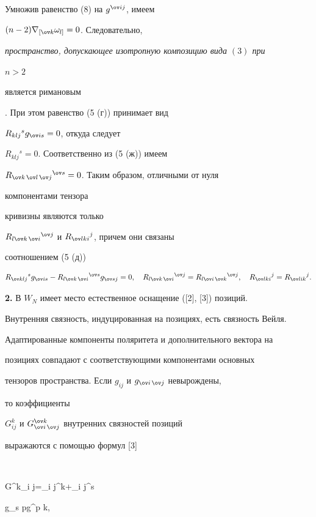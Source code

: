 Умножив равенство (8) на $g^{\ov i j}$, имеем 


$(n-2)\nabla_{[\ov k}\omega_{l]}=0$. Следовательно, 


{\it пространство, допускающее изотропную композицию вида $(3)$ при 


$n>2$ 


является римановым}. При этом равенство (5 (г)) принимает вид 


$R_{k l j}{}^s g_{\ov i s}=0$, откуда следует 


$R_{k l j}{}^s=0$. Соответственно из (5 (ж)) имеем 


$R_{\ov k\,\ov l\,\ov j}{}^{\ov s}=0$. Таким образом, отличными от нуля 


компонентами тензора 


кривизны являются только 


$R_{l\ov k\,\ov i}{}^{\ov j}$ и $R_{\ov l k i}{}^j$, причем они связаны 


соотношением (5 (д)) 


$$ 


R_{\ov k l j}{}^s g_{\ov i s}- 


R_{l\ov k\,\ov i}{}^{\ov s}g_{\ov s j}=0,\quad 


R_{l\ov k\,\ov i}{}^{\ov j}= 


R_{l\ov i\,\ov k}{}^{\ov j},\quad 


R_{\ov l k i}{}^j=R_{\ov l i k}{}^j. 


$$ 


 


{\bf 2.} В $W_N$ имеет место естественное оснащение ([2], [3]) позиций. 


Внутренняя связность, индуцированная на позициях, есть связность Вейля. 


Адаптированные компоненты поляритета и дополнительного вектора на 


позициях совпадают с соответствующими компонентами основных 


тензоров пространства. Если $g_{i j}$ и $g_{\ov i\,\ov j}$ невырождены, 


то коэффициенты 


$G^k_{i j}$ и $G^{\ov k}_{\ov i\,\ov j}$ внутренних связностей позиций 


выражаются с помощью формул [3] 


$$ 


G^k_{i j}=\Gamma_{i j}{}^k+\Gamma_{i j}{}^{\ov s} 


g_{\ov s p}g^{p k},\quad 


